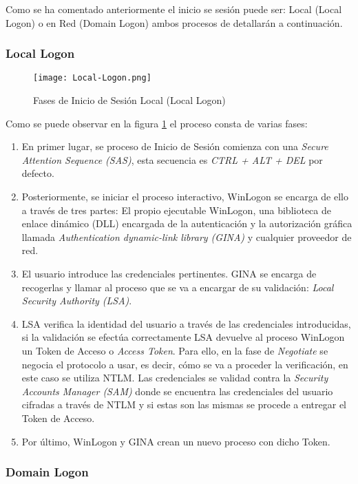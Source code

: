Como se ha comentado anteriormente el inicio se sesión puede ser: Local (Local Logon) o en Red (Domain Logon) ambos procesos de detallarán a continuación. 

\subsubsection{Local Logon}

\begin{figure}[t!] %
\begin{center}
\texttt{[image: Local-Logon.png]}
\end{center}
\caption{Fases de Inicio de Sesión Local (Local Logon)}
\label{local-logon}
\end{figure}
Como se puede observar en la figura \ref{local-logon} el proceso consta de varias fases:
\begin{enumerate}
\item En primer lugar, se proceso de Inicio de Sesión comienza con una {\it Secure Attention Sequence (SAS)}, esta secuencia es {\it CTRL + ALT + DEL} por defecto. 
\item Posteriormente, se iniciar el proceso interactivo, WinLogon se encarga de ello a través de tres partes: El propio ejecutable WinLogon, una biblioteca de enlace dinámico (DLL) encargada de la autenticación y la autorización gráfica llamada {\it Authentication dynamic-link library (GINA)} y cualquier proveedor de red.
\item El usuario introduce las credenciales pertinentes. GINA se encarga de recogerlas y llamar al proceso que se va a encargar de su validación: {\it Local Security Authority (LSA)}.
\item LSA verifica la identidad del usuario a través de las credenciales introducidas, si la validación se efectúa correctamente LSA devuelve al proceso WinLogon un Token de Acceso o {\it Access Token}. Para ello, en la fase de {\it Negotiate} se negocia el protocolo a usar, es decir, cómo se va a proceder la verificación, en este caso se utiliza NTLM. Las credenciales se validad contra la {\it Security Accounts Manager (SAM)} donde se encuentra las credenciales del usuario cifradas a través de NTLM y si estas son las mismas se procede a entregar el Token de Acceso.
\item Por último, WinLogon y GINA crean un nuevo proceso con dicho Token. 
\end{enumerate}

\subsubsection{Domain Logon}

